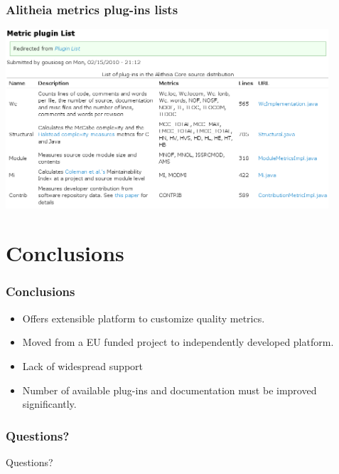 \documentclass{beamer}
\begin{document}
\begin{frame}
\frametitle{Alitheia metrics plug-ins lists}
\begin{center}
\includegraphics[width=0.9\textwidth]{figs/alitheia-metric-plugin-list.png}
\end{center}
\end{frame}

\section{Conclusions}

\begin{frame}
\frametitle{Conclusions}
\begin{center}
\begin{itemize}
\item Offers extensible platform to customize quality metrics.
\item Moved from a EU funded project to independently developed platform.
\item Lack of widespread support
\item Number of available plug-ins and documentation must be improved significantly.

\end{itemize}
\end{center}
\end{frame}




\begin{frame}
\frametitle{Questions?}
\begin{center}
Questions?\\
\end{center}
\end{frame}
\end{document}
